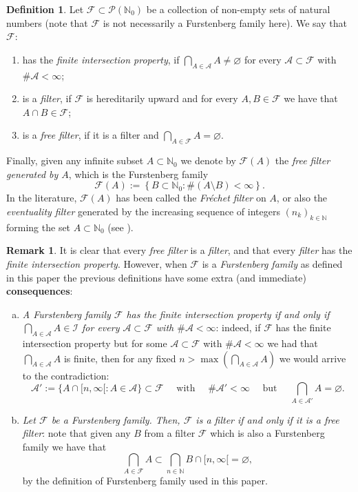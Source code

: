 \documentclass[openright,11pt]{article}
\theoremstyle{plain}
\theoremstyle{definition}
\newtheorem{definition}[theorem]{Definition}
\newtheorem{remark}[theorem]{Remark}
\newcommand{\NN}{\mathbb{N}}
\newcommand{\Ac}{\mathcal{A}}
\newcommand{\Fc}{\mathcal{F}}
\newcommand{\Ic}{\mathcal{I}}
\newcommand{\Part}{\mathscr{P}}
\begin{document}
\begin{definition}
	Let $\Fc \subset \Part(\NN_0)$ be a collection of non-empty sets of natural numbers (note that $\Fc$ is not necessarily a Furstenberg family here). We say that $\Fc$:
	\begin{enumerate}[--]
		\item has the {\em finite intersection property}, if $\bigcap_{A \in \Ac} A \neq \varnothing$ for every $\Ac \subset \Fc$ with $\#\Ac < \infty$;
		
		\item is a {\em filter}, if $\Fc$ is hereditarily upward and for every $A,B \in \Fc$ we have that $A \cap B \in \Fc$;
		
		\item is a {\em free filter}, if it is a filter and $\bigcap_{A \in \Fc} A = \varnothing$.
	\end{enumerate}
	Finally, given any infinite subset $A \subset \NN_0$ we denote by $\Fc(A)$ the {\em free filter generated by $A$}, which is the Furstenberg family
	\[
	\Fc(A) := \left\{ B \subset \NN_0 : \# (A\setminus B) < \infty \right\}.
	\]
	In the literature, $\Fc(A)$ has been called the {\em Fr\'echet filter} on $A$, or also the {\em eventuality filter} generated by the increasing sequence of integers $(n_k)_{k\in\NN}$ forming the set $A \subset \NN_0$ (see \cite{Bourbaki1989}).
\end{definition}

\begin{remark}
	It is clear that every {\em free filter} is a {\em filter}, and that every {\em filter} has the {\em finite intersection property}. However, when $\Fc$ is a {\em Furstenberg family} as defined in this paper the previous definitions have some extra (and immediate) \textbf{consequences}:
	\begin{enumerate}[(a)]
		\item {\em A Furstenberg family $\Fc$ has the finite intersection property if and only if $\bigcap_{A \in \Ac} A \in \Ic$ for every $\Ac \subset \Fc$ with $\#\Ac < \infty$}: indeed, if $\Fc$ has the finite intersection property but for some $\Ac \subset \Fc$ with $\#\Ac < \infty$ we had that $\bigcap_{A \in \Ac} A$ is finite, then for any fixed $n> \max\left(\bigcap_{A \in \Ac} A\right)$ we would arrive to the contradiction: 
		\[
		\Ac' := \{ A \cap [n,\infty[ : A \in \Ac \} \subset \Fc \quad \text{ with } \quad \#\Ac'<\infty \quad \text{ but } \quad \bigcap_{A \in \Ac'} A = \varnothing.
		\]
		
		\item {\em Let $\Fc$ be a Furstenberg family. Then, $\Fc$ is a filter if and only if it is a free filter}: note that given any $B$ from a filter $\Fc$ which is also a Furstenberg family we have that
		\[
		\bigcap_{A \in \Fc} A \subset \bigcap_{n \in \NN} B\cap[n,\infty[ = \varnothing,
		\]
		by the definition of Furstenberg family used in this paper.
	\end{enumerate}
\end{remark}
\end{document}
